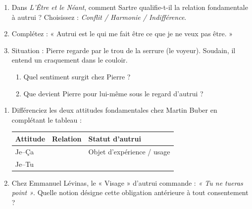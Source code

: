 \documentclass[11pt]{article}
\begin{document}
\begin{exercice}
\begin{enumerate}
    \item Dans \textit{L'Être et le Néant}, comment Sartre qualifie-t-il la relation fondamentale à autrui ? Choisissez : \textit{Conflit / Harmonie / Indifférence}.
    \item Complétez : « Autrui est le \underline{\hspace{3cm}} qui me fait être ce que je ne veux pas être. »
    \item Situation : Pierre regarde par le trou de la serrure (le voyeur). Soudain, il entend un craquement dans le couloir.
    \begin{enumerate}
        \item Quel sentiment surgit chez Pierre ? \underline{\hspace{4cm}}
        \item Que devient Pierre pour lui-même sous le regard d'autrui ? \underline{\hspace{4cm}}
    \end{enumerate}
\end{enumerate}
\end{exercice}

\begin{exercice}
\begin{enumerate}
    \item Différenciez les deux attitudes fondamentales chez Martin Buber en complétant le tableau :
    \begin{tabular}{|l|l|l|}
    \hline
    \textbf{Attitude} & \textbf{Relation} & \textbf{Statut d'autrui} \\
    \hline
    Je–Ça & \underline{\hspace{3cm}} & Objet d'expérience / usage \\
    \hline
    Je–Tu & \underline{\hspace{3cm}} & \underline{\hspace{3cm}} \\
    \hline
    \end{tabular}
    \item Chez Emmanuel Lévinas, le « Visage » d'autrui commande : \textit{« Tu ne tueras point »}. Quelle notion désigne cette obligation antérieure à tout consentement ? \underline{\hspace{5cm}}
\end{enumerate}
\end{exercice}
\end{document}
